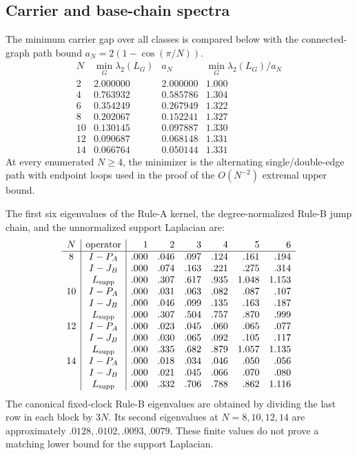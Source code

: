 \documentclass[11pt]{article}
\theoremstyle{definition}
\begin{document}
\subsection{Carrier and base-chain spectra}

The minimum carrier gap over all classes is compared below with the
connected-graph path bound $a_N=2(1-\cos(\pi/N))$.
\[
\begin{array}{c|r|r|r}
N&\min_G\lambda_2(L_G)&a_N&\min_G\lambda_2(L_G)/a_N\\ \hline
2&2.000000&2.000000&1.000\\
4&0.763932&0.585786&1.304\\
6&0.354249&0.267949&1.322\\
8&0.202067&0.152241&1.327\\
10&0.130145&0.097887&1.330\\
12&0.090687&0.068148&1.331\\
14&0.066764&0.050144&1.331
\end{array}
\]
At every enumerated $N\ge4$, the minimizer is the alternating
single/double-edge path with endpoint loops used in the proof of the
$O(N^{-2})$ extremal upper bound.

The first six eigenvalues of the Rule-A kernel, the degree-normalized Rule-B
jump chain, and the unnormalized support Laplacian are:
\[
\begin{array}{c|c|rrrrrr}
N&\text{operator}&1&2&3&4&5&6\\ \hline
8&I-P_A&.000&.046&.097&.124&.161&.194\\
 &I-J_B&.000&.074&.163&.221&.275&.314\\
 &L_{\rm supp}&.000&.307&.617&.935&1.048&1.153\\
10&I-P_A&.000&.031&.063&.082&.087&.107\\
 &I-J_B&.000&.046&.099&.135&.163&.187\\
 &L_{\rm supp}&.000&.307&.504&.757&.870&.999\\
12&I-P_A&.000&.023&.045&.060&.065&.077\\
 &I-J_B&.000&.030&.065&.092&.105&.117\\
 &L_{\rm supp}&.000&.335&.682&.879&1.057&1.135\\
14&I-P_A&.000&.018&.034&.046&.050&.056\\
 &I-J_B&.000&.021&.045&.066&.070&.080\\
 &L_{\rm supp}&.000&.332&.706&.788&.862&1.116
\end{array}
\]
The canonical fixed-clock Rule-B eigenvalues are obtained by dividing the last
row in each block by $3N$.  Its second eigenvalues at $N=8,10,12,14$ are
approximately $.0128,.0102,.0093,.0079$.  These finite values do not prove a
matching lower bound for the support Laplacian.
\end{document}
